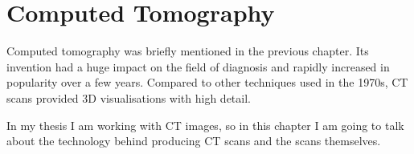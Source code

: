 \chapter{Computed Tomography}
\label{ch:ct}
Computed tomography was briefly mentioned in the previous chapter. Its invention had a huge impact on the field of diagnosis and rapidly increased in popularity over a few years. Compared to other techniques used in the 1970s, CT scans provided 3D visualisations with high detail.

In my thesis I am working with CT images, so in this chapter I am going to talk about the technology behind producing CT scans and the scans themselves.





